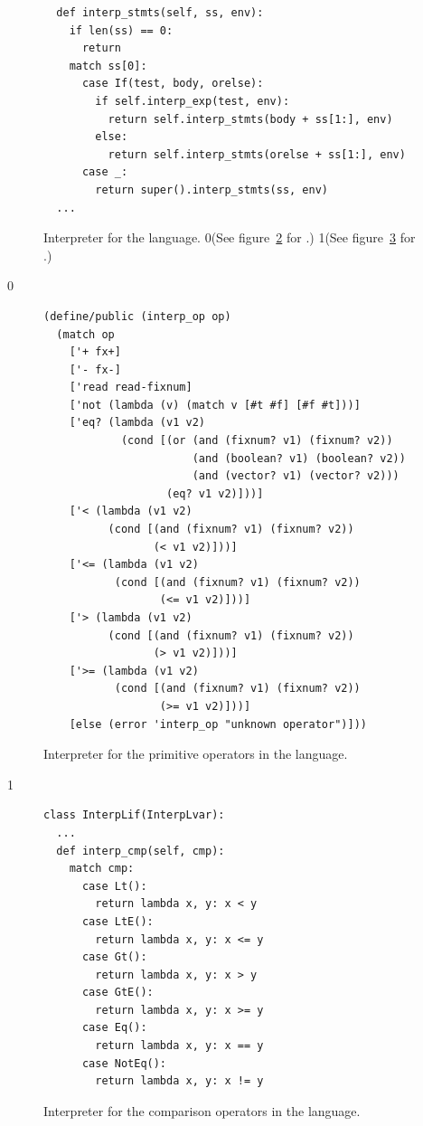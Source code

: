 \documentclass[7x10]{TimesAPriori_MIT}%
\def\racketEd{0}
\def\pythonEd{1}
\def\edition{0}
\newcommand{\racket}[1]{{\if\edition\racketEd{#1}\fi}}
\newcommand{\python}[1]{{\if\edition\pythonEd #1\fi}}
\numberwithin{theorem}{chapter}
\numberwithin{definition}{chapter}
\numberwithin{equation}{chapter}
\begin{document}
\begin{figure}[tbp]
\begin{tcolorbox}[colback=white]
{\begin{lstlisting}
  def interp_stmts(self, ss, env):
    if len(ss) == 0:
      return
    match ss[0]:
      case If(test, body, orelse):
        if self.interp_exp(test, env):
          return self.interp_stmts(body + ss[1:], env)
        else:
          return self.interp_stmts(orelse + ss[1:], env)
      case _:
        return super().interp_stmts(ss, env)
  ...      
\end{lstlisting}
\fi}
\end{tcolorbox}
\caption{Interpreter for the \LangIf{} language. \racket{(See
    figure~\ref{fig:interp-op-Lif} for \code{interp-op}.)}
  \python{(See figure~\ref{fig:interp-cmp-Lif} for \code{interp\_cmp}.)}}
\label{fig:interp-Lif}
\end{figure}

{\if\edition\racketEd
\begin{figure}[tbp]
\begin{tcolorbox}[colback=white]    
\begin{lstlisting}
(define/public (interp_op op)
  (match op
    ['+ fx+]
    ['- fx-]
    ['read read-fixnum]
    ['not (lambda (v) (match v [#t #f] [#f #t]))]
    ['eq? (lambda (v1 v2)
            (cond [(or (and (fixnum? v1) (fixnum? v2))
                       (and (boolean? v1) (boolean? v2))
                       (and (vector? v1) (vector? v2)))
                   (eq? v1 v2)]))]
    ['< (lambda (v1 v2)
          (cond [(and (fixnum? v1) (fixnum? v2))
                 (< v1 v2)]))]
    ['<= (lambda (v1 v2)
           (cond [(and (fixnum? v1) (fixnum? v2))
                  (<= v1 v2)]))]
    ['> (lambda (v1 v2)
          (cond [(and (fixnum? v1) (fixnum? v2))
                 (> v1 v2)]))]
    ['>= (lambda (v1 v2)
           (cond [(and (fixnum? v1) (fixnum? v2))
                  (>= v1 v2)]))]
    [else (error 'interp_op "unknown operator")]))
\end{lstlisting}
\end{tcolorbox}

\caption{Interpreter for the primitive operators in the \LangIf{} language.}
\label{fig:interp-op-Lif}
\end{figure}
\fi}

{\if\edition\pythonEd
\begin{figure}
\begin{tcolorbox}[colback=white]
\begin{lstlisting}
class InterpLif(InterpLvar):
  ...
  def interp_cmp(self, cmp):
    match cmp:
      case Lt():
        return lambda x, y: x < y
      case LtE():
        return lambda x, y: x <= y
      case Gt():
        return lambda x, y: x > y
      case GtE():
        return lambda x, y: x >= y
      case Eq():
        return lambda x, y: x == y
      case NotEq():
        return lambda x, y: x != y
\end{lstlisting}
\end{tcolorbox}

\caption{Interpreter for the comparison operators in the \LangIf{} language.}
\label{fig:interp-cmp-Lif}
\end{figure}
\fi}
\end{document}
